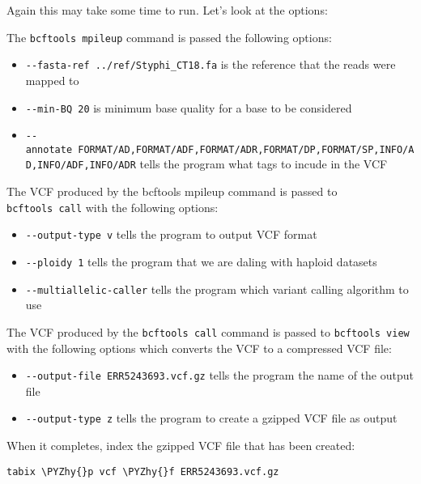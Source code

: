 \documentclass[11pt]{article}
\makeatletter
\providecommand{\tightlist}{%
      \setlength{\itemsep}{0pt}\setlength{\parskip}{0pt}}
\def\PYZhy{\char`\-}
\newcommand{\boxspacing}{\kern\kvtcb@left@rule\kern\kvtcb@boxsep}
\newcommand{\prompt}[4]{
        {
        \ttfamily\llap{{\color{blue}\LARGE\faKeyboardO\hspace{3pt}#4}}\vspace{-\baselineskip}
	}
    }
\makeatother
\begin{document}
    Again this may take some time to run. Let's look at the options:

The \texttt{bcftools\ mpileup} command is passed the following options:

\begin{itemize}
\tightlist
\item
  \texttt{-\/-fasta-ref\ ../ref/Styphi\_CT18.fa} is the reference that
  the reads were mapped to
\item
  \texttt{-\/-min-BQ\ 20} is minimum base quality for a base to be
  considered
\item
  \texttt{-\/-annotate\ FORMAT/AD,FORMAT/ADF,FORMAT/ADR,FORMAT/DP,FORMAT/SP,INFO/AD,INFO/ADF,INFO/ADR}
  tells the program what tags to incude in the VCF
\end{itemize}

The VCF produced by the bcftools mpileup command is passed to
\texttt{bcftools\ call} with the following options:

\begin{itemize}
\tightlist
\item
  \texttt{-\/-output-type\ v} tells the program to output VCF format
\item
  \texttt{-\/-ploidy\ 1} tells the program that we are daling with
  haploid datasets
\item
  \texttt{-\/-multiallelic-caller} tells the program which variant
  calling algorithm to use
\end{itemize}

The VCF produced by the \texttt{bcftools\ call} command is passed to
\texttt{bcftools\ view} with the following options which converts the
VCF to a compressed VCF file:

\begin{itemize}
\tightlist
\item
  \texttt{-\/-output-file\ ERR5243693.vcf.gz} tells the program the name
  of the output file
\item
  \texttt{-\/-output-type\ z} tells the program to create a gzipped VCF
  file as output
\end{itemize}

When it completes, index the gzipped VCF file that has been created:

    \begin{tcolorbox}[breakable, size=fbox, boxrule=1pt, pad at break*=1mm,colback=cellbackground, colframe=cellborder]
\prompt{In}{incolor}{ }{\boxspacing}
\begin{Verbatim}[commandchars=\\\{\}]
tabix \PYZhy{}p vcf \PYZhy{}f ERR5243693.vcf.gz
\end{Verbatim}
\end{tcolorbox}
\end{document}
